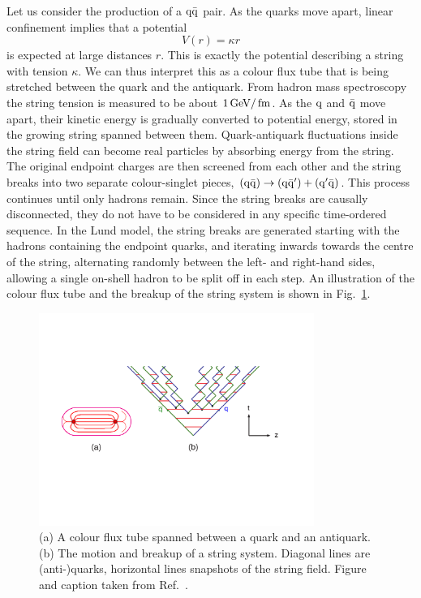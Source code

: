 Let us consider the production of a $\mathrm{q}\bar{\mathrm{q}}$ pair. As the quarks move apart,
linear confinement implies that a potential
\begin{equation}
  V(r) = \kappa r
\end{equation}
is expected at large distances $r$.  This is exactly the potential describing a
string with tension $\kappa$. We can thus interpret this as a colour flux tube that is being
stretched
between the quark and the antiquark. From hadron mass spectroscopy the string tension is
measured to be about $1\,\text{Ge\hspace{-.08em}V}/\text{\,fm}$.
As the $\mathrm{q}$ and $\bar{\mathrm{q}}$ move apart, their kinetic energy is gradually converted to potential
energy, stored in the growing string spanned between them. 
Quark-antiquark fluctuations inside the string field can become real particles by absorbing energy
from the string. The original endpoint charges are then screened from each other and the
string breaks into two separate colour-singlet pieces, $(\mathrm{q} \bar{\mathrm{q}}) \rightarrow (\mathrm{q}
\bar{\mathrm{q}}') + (\mathrm{q}' \bar{\mathrm{q}})$. This process continues until only hadrons remain.
Since the string breaks are causally disconnected, they do not have to be considered in any
specific time-ordered sequence. In the Lund model, the string breaks are generated starting
with the hadrons containing the endpoint quarks, and iterating inwards towards the centre of the
string, alternating randomly between the left- and right-hand sides, allowing a single on-shell
hadron to be split off in each step. An illustration of the colour flux tube and the breakup of the
string system is shown in Fig.~\ref{fig:hadronization_string}.

\begin{figure}[htpb]
  \centering
  \includegraphics[width=0.8\textwidth]{figures/eventreco_generation/stringone}
  \caption{ (a) A colour flux tube spanned between a quark and an antiquark. (b) The motion
and breakup of a string system. Diagonal lines are (anti-)quarks, horizontal lines snapshots of the
string field. Figure and caption taken from Ref.~\cite{Buckley:2011ms}.
  \label{fig:hadronization_string}}
\end{figure}


